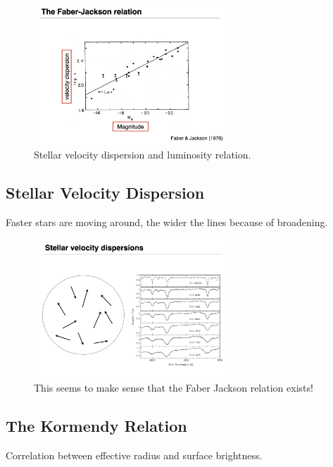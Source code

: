 \documentclass{article}
\begin{document}
\begin{figure}
    \centering
\includegraphics[width=0.66\textwidth]{figs/Screen Shot 2021-10-15 at 10.29.44 AM.png}
    \caption{Stellar velocity dispersion and luminosity relation.}
    \label{fig:faber_jackson}
\end{figure}

\subsection{Stellar Velocity Dispersion}

Faster stars are moving around, the wider the lines because of broadening. 

\begin{figure}
    \centering
\includegraphics[width=0.66\textwidth]{figs/Screen Shot 2021-10-15 at 10.30.29 AM.png}
    \caption{This seems to make sense that the Faber Jackson relation exists!}
    \label{fig:faber_jackson_explanation}
\end{figure}

\subsection{The Kormendy Relation}

Correlation between effective radius and surface brightness. 
\end{document}
